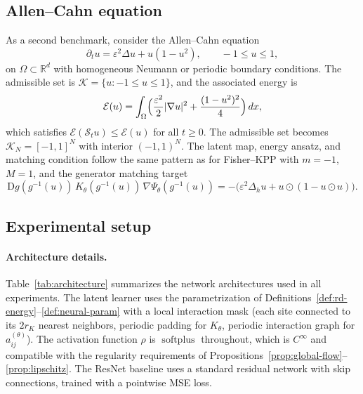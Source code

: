 \documentclass[11pt]{article}
\newcommand{\R}{\mathbb{R}}
\newcommand{\cS}{\mathcal{S}}
\newcommand{\cK}{\mathcal{K}}
\newcommand{\cE}{\mathcal{E}}
\newcommand{\softplus}{\operatorname{softplus}}
\begin{document}
\subsection{Allen--Cahn equation}\label{subsec:allen-cahn}
As a second benchmark, consider the Allen--Cahn equation
\begin{equation}\label{eq:allen-cahn-bench}
\partial_t u = \varepsilon^2 \Delta u + u(1-u^2), \qquad -1\le u\le 1,
\end{equation}
on $\Omega\subset \R^d$ with homogeneous Neumann or periodic boundary conditions. The admissible set is $\cK=\{u:-1\le u\le 1\}$, and the associated energy is
\begin{equation}\label{eq:allen-cahn-energy}
\cE(u)=\int_\Omega\Bigl(\frac{\varepsilon^2}{2}|\nabla u|^2 + \frac{(1-u^2)^2}{4}\Bigr)\,dx,
\end{equation}
which satisfies $\cE(\cS_t u)\le \cE(u)$ for all $t\ge 0$. The admissible set becomes $\cK_N=[-1,1]^N$ with interior $(-1,1)^N$. The latent map, energy ansatz, and matching condition follow the same pattern as for Fisher--KPP with $m=-1$, $M=1$, and the generator matching target
\begin{equation}\label{eq:matching-allen-cahn}
\mathrm{D}g(g^{-1}(u))\,K_{\theta}(g^{-1}(u))\,\nabla\Psi_{\theta}(g^{-1}(u)) = -\bigl(\varepsilon^2\Delta_h u + u\odot(1-u\odot u)\bigr).
\end{equation}

\subsection{Experimental setup}\label{subsec:exp-setup}

\paragraph{Architecture details.}
Table~\ref{tab:architecture} summarizes the network architectures used in all experiments. The latent learner uses the parametrization of Definitions~\ref{def:rd-energy}--\ref{def:neural-param} with a local interaction mask (each site connected to its $2r_K$ nearest neighbors, periodic padding for $K_{\theta}$, periodic interaction graph for $a_{ij}^{(\theta)}$). The activation function $\rho$ is $\softplus$ throughout, which is $C^{\infty}$ and compatible with the regularity requirements of Propositions~\ref{prop:global-flow}--\ref{prop:lipschitz}. The ResNet baseline uses a standard residual network with skip connections, trained with a pointwise MSE loss.
\end{document}
